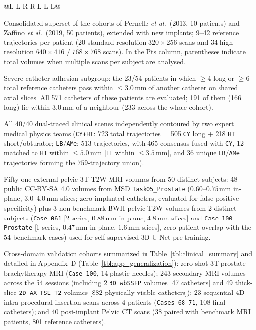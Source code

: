 \begin{table}[tbp]
\begin{threeparttable}
\begin{tabular}{@{}L L R R L L L@{}}
\end{tabular}
\begin{tablenotes}[flushleft]\footnotesize
\item[a] Consolidated superset of the cohorts of Pernelle \emph{et al.}\ (2013, 10 patients) and Zaffino \emph{et al.}\ (2019, 50 patients), extended with new implants; 9--42 reference trajectories per patient (20 standard-resolution $320\times256$ scans and 34 high-resolution $640\times416$ / $768\times768$ scans). In the Pts column, parentheses indicate total volumes when multiple scans per subject are analysed.
\item[b] Severe catheter-adhesion subgroup: the 23/54 patients in which $\ge 4$ long or $\ge 6$ total reference catheters pass within $\le 3.0$\,mm of another catheter on shared axial slices. All 571 catheters of these patients are evaluated; 191 of them (166 long) lie within $3.0$\,mm of a neighbour (233 across the whole cohort).
\item[c] All 40/40 dual-traced clinical scenes independently contoured by two expert medical physics teams (\texttt{CY+HT}: 723 total trajectories = 505 \texttt{CY} long + 218 \texttt{HT} short/obturator; \texttt{LB}/\texttt{AMe}: 513 trajectories, with 465 consensus-fused with \texttt{CY}, 12 matched to \texttt{HT} within $\le 5.0$\,mm [$11$ within $\le 3.5$\,mm], and $36$ unique \texttt{LB}/\texttt{AMe} trajectories forming the $759$-trajectory union).
\item[d] Fifty-one external pelvic 3T T2W MRI volumes from 50 distinct subjects: 48 public CC-BY-SA 4.0 volumes from MSD \texttt{Task05\_Prostate} ($0.60\text{--}0.75$\,mm in-plane, $3.0\text{--}4.0$\,mm slices; zero implanted catheters, evaluated for false-positive specificity) plus 3 non-benchmark BWH pelvic T2W volumes from 2 distinct subjects (\texttt{Case 061} [2 series, $0.88$\,mm in-plane, $4.8$\,mm slices] and \texttt{Case 100 Prostate} [1 series, $0.47$\,mm in-plane, $1.6$\,mm slices], zero patient overlap with the 54 benchmark cases) used for self-supervised 3D U-Net pre-training.
\item[e] Cross-domain validation cohorts summarized in Table~\ref{tbl:clinical_summary} and detailed in Appendix~D (Table~\ref{tbl:app_generalization}): zero-shot 3T prostate brachytherapy MRI (\texttt{Case 100}, 14 plastic needles); 243 secondary MRI volumes across the 54 sessions (including 2 \texttt{3D wbSSFP} volumes [47 catheters] and 49 thick-slice \texttt{2D AX TSE T2} volumes [882 physically visible catheters]); 23 sequential 4D intra-procedural insertion scans across 4 patients (\texttt{Cases 68--71}, 108 final catheters); and 40 post-implant Pelvic CT scans (38 paired with benchmark MRI patients, 801 reference catheters).
\end{tablenotes}
\end{threeparttable}
\end{table}
